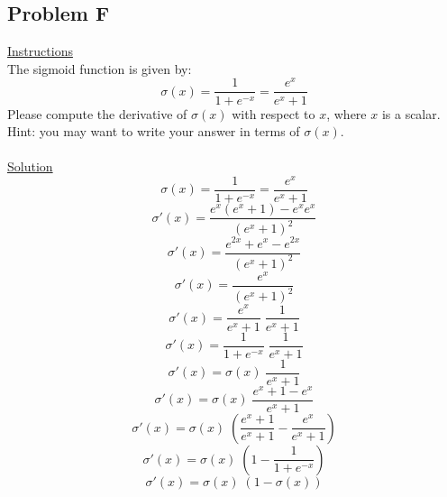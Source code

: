 \documentclass[12pt]{article}
\begin{document}
\subsection{Problem F}
\underline{Instructions}
~\\
The sigmoid function is given by:
\begin{equation*}
    \label{Sigmoid Function}
    \sigma (x) = \frac{1}{1 + e^{-x}} = \frac{e^{x}}{e^{x} + 1}
\end{equation*}
Please compute the derivative of $\sigma(x)$ with respect to $x$,
where $x$ is a scalar. Hint: you may want to write your answer in terms of $\sigma(x)$.
~\\
~\\
\underline{Solution}
~\\
\begin{equation*}
    \sigma (x) = \frac{1}{1 + e^{-x}} = \frac{e^{x}}{e^{x} + 1}
\end{equation*}
\begin{equation*}
    \sigma' (x) = \frac{e^{x} (e^{x}+1) - e^{x}e^{x}}{(e^{x} + 1)^2}
\end{equation*}
\begin{equation*}
    \sigma' (x) = \frac{e^{2x} + e^{x} - e^{2x}}{(e^{x} + 1)^2}
\end{equation*}
\begin{equation*}
    \sigma' (x) = \frac{e^{x}}{(e^{x} + 1)^2}
\end{equation*}
\begin{equation*}
    \sigma' (x) = \frac{e^{x}}{e^{x} + 1} \; \frac{1}{e^{x} + 1}
\end{equation*}
\begin{equation*}
    \sigma' (x) = \frac{1}{1 + e^{-x}} \; \frac{1}{e^{x} + 1}
\end{equation*}
\begin{equation*}
    \sigma' (x) = \sigma(x) \; \frac{1}{e^{x} + 1}
\end{equation*}
\begin{equation*}
    \sigma' (x) = \sigma(x) \; \frac{e^{x} + 1 - e^{x}}{e^{x} + 1}
\end{equation*}
\begin{equation*}
    \sigma' (x) = \sigma(x) \; (\frac{e^x + 1}{e^x + 1} - \frac{e^{x}}{e^{x} + 1})
\end{equation*}
\begin{equation*}
    \sigma' (x) = \sigma(x) \; (1 - \frac{1}{1 + e^{-x}})
\end{equation*}\begin{equation*}
    \sigma' (x) = \sigma(x) \; (1 - \sigma(x))
\end{equation*}
\end{document}
